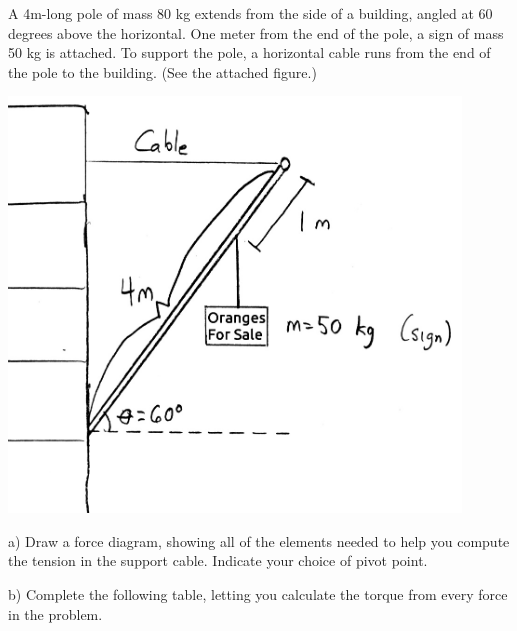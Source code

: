 \documentclass[12pt]{article}
\begin{document}
\begin{minipage}[b]{0.4\textwidth}
  \vspace{-0.8in}

A 4m-long pole of mass 80 kg extends from the side of a building, angled at 60 degrees above the horizontal. One meter from the end of the pole, a sign of mass 50 kg is attached. To support the pole,
a horizontal cable runs from the end of the pole to the building. (See the attached figure.)

\bigskip
\bigskip
\bigskip
\bigskip
\bigskip
\bigskip

\end{minipage}
\begin{minipage}[t]{0.6\textwidth}
  \begin{flushright}
  \includegraphics[width=0.9\textwidth]{sign2.jpg}
\end{flushright}
\end{minipage}

\bigskip
\bigskip

\newpage

a) Draw a force diagram, showing all of the elements needed to help you compute the tension in the support cable. Indicate
your choice of pivot point.

\vspace{5in}

\newpage


b) Complete the following table, letting you calculate the torque from every force in the problem. 
\end{document}
